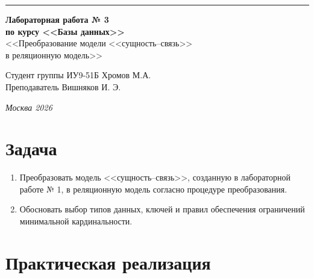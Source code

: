 \documentclass[a4paper, 14pt]{extarticle}
\begin{document}
\begin{titlepage}
\vspace*{-16pt}
\hspace{30pt}\rule{0.866\textwidth}{0.4pt}

\vspace{11em}

\begin{center}
\Large {\bf Лабораторная работа № 3} \\

\large {\bf по курсу <<Базы данных>>} \\[0.8cm]

\large <<Преобразование модели <<сущность--связь>>\\
в реляционную модель>>
\end{center}
\normalsize

\vspace{8em}


\begin{flushright}
  {Студент группы ИУ9-51Б Хромов М.А. \hspace*{15pt}\\
  \vspace{2ex}
  Преподаватель Вишняков И. Э.\hspace*{15pt}}
\end{flushright}

\bigskip

\vfill


\begin{center}
\textsl{Москва 2026}
\end{center}
\end{titlepage}



\setcounter{page}{2}

\section{Задача}
\begin{enumerate}
  \item Преобразовать модель <<сущность--связь>>, созданную в лабораторной работе № 1, в реляционную модель согласно процедуре преобразования.
  \item Обосновать выбор типов данных, ключей и правил обеспечения ограничений минимальной кардинальности.
\end{enumerate}

\section{Практическая реализация}
\end{document}
